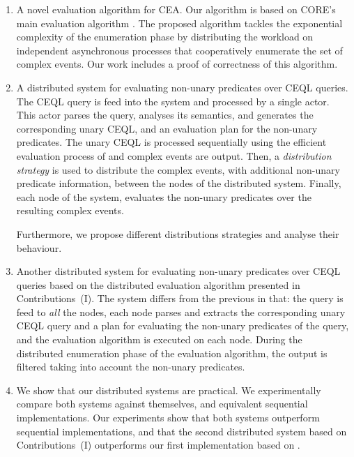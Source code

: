 \begin{enumerate}[label=(\roman*)]
  \item A novel evaluation algorithm for CEA. Our algorithm is based on CORE's main evaluation algorithm \cite{core}. The proposed algorithm tackles the exponential complexity of the enumeration phase by distributing the workload on independent asynchronous processes that cooperatively enumerate the set of complex events. Our work includes a proof of correctness of this algorithm.

  \item A distributed system for evaluating non-unary predicates over CEQL queries. The CEQL query is feed into the system and processed by a single actor. This actor parses the query, analyses its semantics, and generates the corresponding unary CEQL, and an evaluation plan for the non-unary predicates. The unary CEQL is processed sequentially using the efficient evaluation process of \cite{formal-framework-cep} and complex events are output. Then, a \emph{distribution strategy} is used to distribute the complex events, with additional non-unary predicate information, between the nodes of the distributed system. Finally, each node of the system, evaluates the non-unary predicates over the resulting complex events.

  Furthermore, we propose different distributions strategies and analyse their behaviour.

  \item Another distributed system for evaluating non-unary predicates over CEQL queries based on the distributed evaluation algorithm presented in Contributions~(I). The system differs from the previous in that: the query is feed to \emph{all} the nodes, each node parses and extracts the corresponding unary CEQL query and a plan for evaluating the non-unary predicates of the query, and the evaluation algorithm is executed on each node. During the distributed enumeration phase of the evaluation algorithm, the output is filtered taking into account the non-unary predicates.

  \item We show that our distributed systems are practical. We experimentally compare both systems against themselves, and equivalent sequential implementations. Our experiments show that both systems outperform sequential implementations, and that the second distributed system based on Contributions~(I) outperforms our first implementation based on \cite{formal-framework-cep}.
\end{enumerate}

